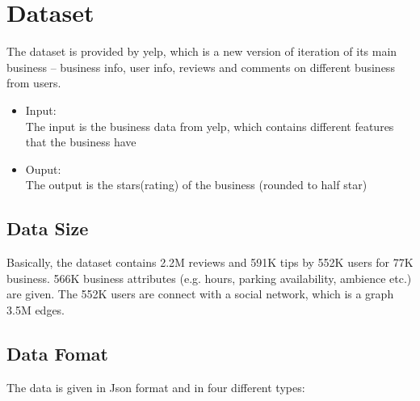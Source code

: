 \documentclass{article}
\begin{document}
\section{Dataset}
The dataset is provided by yelp, which is a new version of iteration of its main business -- business info, user info, reviews and comments on different business from users.
\begin{itemize}
\item Input:\hfill \\The input is the business data from yelp, which contains different features that the business have
\item Ouput:\hfill \\ The output is the stars(rating) of the business (rounded to half star)
\end{itemize}
\subsection{Data Size}
Basically, the dataset contains 2.2M reviews and 591K tips by 552K users for 77K business.
566K business attributes (e.g. hours, parking availability, ambience etc.) are given.
The 552K users are connect with a social network, which is a graph 3.5M edges.

\subsection{Data Fomat}
The data is given in Json format and in four different types:
\end{document}
